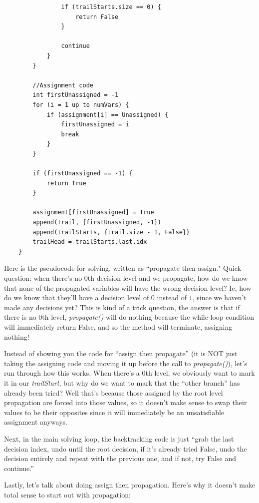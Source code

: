 \documentclass[../main.tex]{subfiles}
\begin{document}
\begin{lstlisting}
                if (trailStarts.size == 0) {
                    return False
                }

                continue
            }
        }

        //Assignment code
        int firstUnassigned = -1
        for (i = 1 up to numVars) {
            if (assignment[i] == Unassigned) {
                firstUnassigned = i
                break
            }
        }

        if (firstUnassigned == -1) {
            return True
        }

        assignment[firstUnassigned] = True
        append(trail, {firstUnassigned, -1})
        append(trailStarts, {trail.size - 1, False})
        trailHead = trailStarts.last.idx
    }
\end{lstlisting}

Here is the pseudocode for solving, written as ``propagate then assign." Quick question:
when there's no 0th decision level and we propagate, how do we know that none of the 
propagated variables will have the wrong decision level? Ie, how do we know that they'll 
have a decision level of $0$ instead of $1$, since we haven't made any decisions yet?
This is kind of a trick question, the answer is that if there is no 0th level,
\textit{propagate()} will do nothing because the while-loop condition will immediately 
return False, and so the method will terminate, assigning nothing! 

Instead of showing you the code for ``assign then propagate'' (it is NOT just taking 
the assigning code and moving it up before the call to \textit{propagate()}), let's 
run through how this works. When there's a 0th level, we obviously want to mark it 
in our \textit{trailStart}, but why do we want to mark that the ``other branch'' has 
already been tried? Well that's because those assigned by the root level propagation 
are forced into those values, so it doesn't make sense to swap their values to be 
their opposites since it will immediately be an unsatisfiable assignment anyways. 

Next, in the main solving loop, the backtracking code is just ``grab the last 
decision index, undo until the root decision, if it's already tried False, undo 
the decision entirely and repeat with the previous one, and if not, try False 
and continue.''

Lastly, let's talk about doing assign then propagation. Here's why it doesn't
make total sense to start out with propagation:
\end{document}
